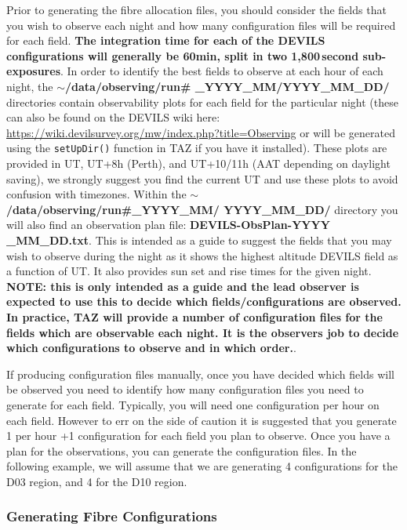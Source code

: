 \documentclass[12pt]{article}
\begin{document}
Prior to generating the fibre allocation files, you should consider the fields that you wish to observe each night and how many configuration files will be required for each field. \textbf{The integration time for each of the DEVILS configurations will generally be 60min, split in two 1,800\,second sub-exposures}. In order to identify the best fields to observe at each hour of each night, the \textbf{$\sim$/data/observing/run\# \_YYYY\_MM/YYYY\_MM\_DD/} directories contain observability plots for each field for the particular night (these can also be found on the DEVILS wiki here: \url{https://wiki.devilsurvey.org/mw/index.php?title=Observing} or will be generated using the \texttt{setUpDir()} function in TAZ if you have it installed). These plots are provided in UT, UT+8h (Perth), and UT+10/11h (AAT depending on daylight saving), we strongly suggest you find the current UT and use these plots to avoid confusion with timezones. Within the \textbf{$\sim$/data/observing/run\#\_YYYY\_MM/ YYYY\_MM\_DD/}  directory you will also find an observation plan file: \textbf{DEVILS-ObsPlan-YYYY \_MM\_DD.txt}. This is intended as a guide to suggest the fields that you may wish to observe during the night as it shows the highest altitude DEVILS field as a function of UT. It also provides sun set and rise times for the given night. \textbf{\textcolor{PineGreen}{NOTE:
 this is only intended as a guide and the lead observer is expected to use this to decide which fields/configurations are observed.  In practice, TAZ will provide a number of configuration files for the fields which are observable each night. It is the observers job to decide which configurations to observe and in which order.}}.

If producing configuration files manually, once you have decided which fields will be observed you need to identify how many configuration files you need to generate for each field. Typically, you will need one configuration per hour on each field. However to err on the side of caution it is suggested that you generate 1 per hour +1 configuration for each field you plan to observe. Once you have a plan for the observations, you can generate the configuration files. In the following example, we will assume that we are generating 4 configurations for the D03 region, and 4 for the D10 region.      


\subsubsection{Generating Fibre Configurations}
\end{document}
